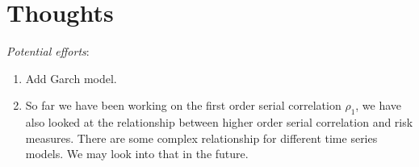 \documentclass[11pt]{article}
\begin{document}
\section{Thoughts} %

\textit{Potential efforts}:
\begin{enumerate}
\item Add Garch model.
\item So far we have been working on the first order serial correlation $\rho_1$, we have also looked at the relationship between higher order serial correlation and risk measures. There are some complex relationship for different time series models. We may look into that in the future. 
\end{enumerate}
\end{document}
